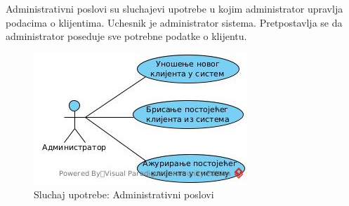 Administrativni poslovi su sluchajevi upotrebe u kojim administrator upravlja podacima o klijentima. Uchesnik je administrator sistema. Pretpostavlja se da administrator poseduje sve potrebne podatke o klijentu.

\begin{figure}[H]
    \includegraphics{Slike/UML/SUadministrativniPoslovi.jpg}
    \centering
    \caption{Sluchaj upotrebe: Administrativni poslovi}
\end{figure}  
